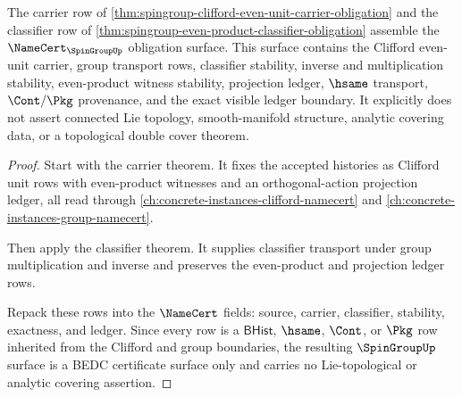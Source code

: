 \begin{theorem}
\label{thm:spingroup-namecert-obligation-surface}
The carrier row of
\autoref{thm:spingroup-clifford-even-unit-carrier-obligation} and the
classifier row of
\autoref{thm:spingroup-even-product-classifier-obligation} assemble the
$\NameCert_{\SpinGroupUp}$ obligation surface. This surface contains the
Clifford even-unit carrier, group transport rows, classifier stability, inverse
and multiplication stability, even-product witness stability, projection
ledger, $\hsame$ transport, $\Cont/\Pkg$ provenance, and the exact visible
ledger boundary. It explicitly does not assert connected Lie topology,
smooth-manifold structure, analytic covering data, or a topological double
cover theorem.
\end{theorem}
\begin{proof}
Start with the carrier theorem. It fixes the accepted histories as Clifford
unit rows with even-product witnesses and an orthogonal-action projection
ledger, all read through \autoref{ch:concrete-instances-clifford-namecert} and
\autoref{ch:concrete-instances-group-namecert}.

Then apply the classifier theorem. It supplies classifier transport under
group multiplication and inverse and preserves the even-product and projection
ledger rows.

Repack these rows into the $\NameCert$ fields: source, carrier, classifier,
stability, exactness, and ledger. Since every row is a $\mathsf{BHist}$,
$\hsame$, $\Cont$, or $\Pkg$ row inherited from the Clifford and group
boundaries, the resulting $\SpinGroupUp$ surface is a BEDC certificate surface
only and carries no Lie-topological or analytic covering assertion.
\end{proof}

